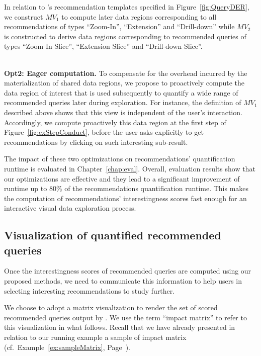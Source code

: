 In relation to \prototype{}'s recommendation templates specified in %
Figure~\ref{fig:QueryDER},
 we construct $MV_1$ to compute later data regions corresponding to all recommendations of types ``Zoom-In'', ``Extension'' and ``Drill-down''   while $MV_2$ is constructed to derive data regions corresponding to recommended queries of types ``Zoom In Slice'', ``Extension Slice'' and ``Drill-down Slice''.


~~\\
\noindent \textbf{Opt2: Eager computation.} To compensate for the overhead incurred by the materialization of shared data regions, we propose to proactively compute the data region of interest that is used subsequently to quantify a wide range of recommended queries later during exploration. For instance, the definition of $MV_1$ described above shows that this view is independent of the user's interaction. 
Accordingly, we compute proactively this data region at the first step of Figure~\ref{fig:exStepConduct}, before the user asks explicitly to get recommendations by clicking on such interesting sub-result.

The impact of these two optimizations on recommendations' quantification runtime is evaluated in Chapter~\ref{chap:eval}. 
Overall, evaluation results show that our optimizations are effective and they lead to a significant improvement of runtime up to 80\% of the recommendations quantification runtime. 
This makes the computation of recommendations' interestingness scores fast enough for an interactive visual data exploration process. 





 \subsection{Visualization of quantified recommended queries}
 \label{subsec:visQuantification}
Once the interestingness scores of recommended queries are computed using our proposed methods, we need to communicate this information to help users in selecting interesting recommendations to study further.

We choose to adopt a matrix visualization to render the set of scored recommended queries output by \prototype{}. We use the term ``impact matrix'' to refer to this visualization in what follows. 
Recall that we have already presented in relation to our running example a sample of impact matrix (cf.~Example~\ref{ex:sampleMatrix}, Page~\pageref{ex:sampleMatrix}). 

